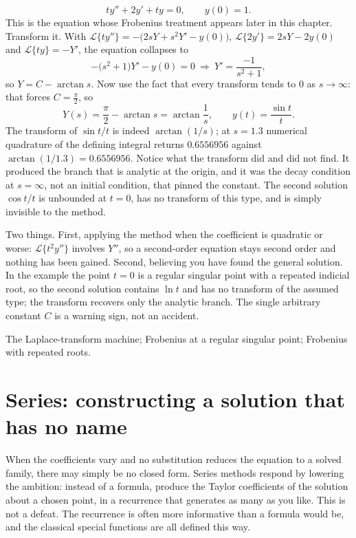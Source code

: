 \begin{worked}
\[t y''+2y'+t y=0,\qquad y(0)=1.\]
This is the equation whose Frobenius treatment appears later in this chapter. Transform it. With $\mathcal{L}\{ty''\}=-\bigl(2sY+s^{2}Y'-y(0)\bigr)$, $\mathcal{L}\{2y'\}=2sY-2y(0)$ and $\mathcal{L}\{ty\}=-Y'$, the equation collapses to
\[-\bigl(s^{2}+1\bigr)Y'-y(0)=0\ \Longrightarrow\ Y'=\frac{-1}{s^{2}+1},\]
so $Y=C-\arctan s$. Now use the fact that every transform tends to $0$ as $s\to\infty$: that forces $C=\tfrac{\pi}{2}$, so
\[Y(s)=\frac{\pi}{2}-\arctan s=\arctan\frac1s,\qquad y(t)=\frac{\sin t}{t}.\]
The transform of $\sin t/t$ is indeed $\arctan(1/s)$; at $s=1.3$ numerical quadrature of the defining integral returns $0.6556956$ against $\arctan(1/1.3)=0.6556956$. Notice what the transform did and did not find. It produced the branch that is analytic at the origin, and it was the decay condition at $s=\infty$, not an initial condition, that pinned the constant. The second solution $\cos t/t$ is unbounded at $t=0$, has no transform of this type, and is simply invisible to the method.
\end{worked}

\begin{trap}
Two things. First, applying the method when the coefficient is quadratic or worse: $\mathcal{L}\{t^{2}y''\}$ involves $Y''$, so a second-order equation stays second order and nothing has been gained. Second, believing you have found the general solution. In the example the point $t=0$ is a regular singular point with a repeated indicial root, so the second solution contains $\ln t$ and has no transform of the assumed type; the transform recovers only the analytic branch. The single arbitrary constant $C$ is a warning sign, not an accident.
\end{trap}

\begin{seealsob}The Laplace-transform machine; Frobenius at a regular singular point; Frobenius with repeated roots.\end{seealsob}

\section{Series: constructing a solution that has no name}

When the coefficients vary and no substitution reduces the equation to a solved family, there may simply be no closed form. Series methods respond by lowering the ambition: instead of a formula, produce the Taylor coefficients of the solution about a chosen point, in a recurrence that generates as many as you like. This is not a defeat. The recurrence is often more informative than a formula would be, and the classical special functions are all defined this way.

